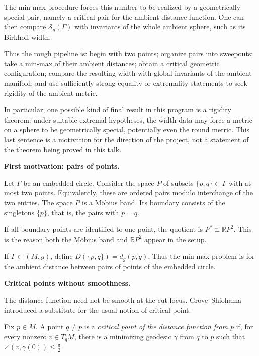 The min-max procedure forces this number to
be realized by a geometrically special pair,
namely a critical pair for the ambient
distance function. One can then compare
$\mathcal{S}_g(\Gamma)$ with invariants of
the whole ambient sphere, such as its
Birkhoff width.

Thus the rough pipeline is: begin with two
points; organize pairs into sweepouts; take
a min-max of their ambient distances; obtain
a critical geometric configuration; compare
the resulting width with global invariants
of the ambient manifold; and use sufficiently
strong equality or extremality statements to
seek rigidity of the ambient metric.

In particular, one possible kind of final
result in this program is a rigidity theorem:
under suitable extremal hypotheses, the
width data may force a metric on a sphere to
be geometrically special, potentially even
the round metric. This last sentence is a
motivation for the direction of the project,
not a statement of the theorem being proved
in this talk.

\medskip\noindent
{\bf First motivation: pairs of points.}

Let $\Gamma$ be an embedded circle.
Consider the space $P$ of subsets
$\{p,q\}\subset\Gamma$ with at most two
points. Equivalently, these are ordered
pairs modulo interchange of the two
entries. The space $P$ is a M\"obius band.
Its boundary consists of the singletons
$\{p\}$, that is, the pairs with $p=q$.

If all boundary points are identified to
one point, the quotient is
$
P^*\cong\mathbb{R}P^2.
$
This is the reason both the M\"obius band
and $\mathbb{R}P^2$ appear in the setup.

If $\Gamma\subset(M,g)$, define
$
D(\{p,q\})=d_g(p,q).
$
Thus the min-max problem is for the
ambient distance between pairs of points
of the embedded circle.

\medskip\noindent
{\bf Critical points without smoothness.}

The distance function need not be smooth
at the cut locus. Grove--Shiohama
introduced a substitute for the usual
notion of critical point.

\begin{definition}
Fix $p\in M$. A point $q\neq p$ is a
{\it critical point of the distance
function from $p$} if, for every nonzero
$v\in T_qM$, there is a minimizing
geodesic $\gamma$ from $q$ to $p$ such
that
$
\angle(v,\dot\gamma(0))\leq\frac{\pi}{2}.
$
\end{definition}

